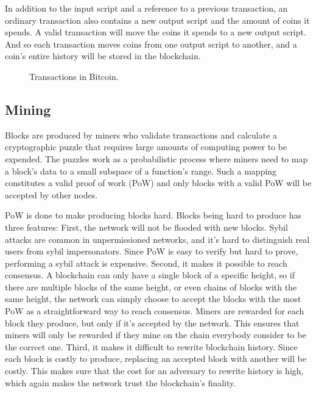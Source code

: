 In addition to the input script and a reference to a previous transaction, an ordinary transaction also contains a new output script and the amount of coins it spends. A valid transaction will move the coins it spends to a new output script. And so each transaction moves coins from one output script to another, and a coin's entire history will be stored in the blockchain. 

\begin{figure}[htbp]
  \centering
  
  \caption{Transactions in Bitcoin.}
  \label{fig:bitcoin-transactions}
\end{figure}

\subsection{Mining}

Blocks are produced by miners who validate transactions and calculate a cryptographic puzzle that requires large amounts of computing power to be expended. The puzzles work as a probabilistic process where miners need to map a block's data to a small subspace of a function's range. Such a mapping constitutes a valid proof of work (PoW) and only blocks with a valid PoW will be accepted by other nodes. 

PoW is done to make producing blocks hard. Blocks being hard to produce has three features: First, the network will not be flooded with new blocks. Sybil attacks are common in unpermissioned networks, and it's hard to distinguish real users from sybil impersonators. Since PoW is easy to verify but hard to prove, performing a sybil attack is expensive. Second, it makes it possible to reach consensus. A blockchain can only have a single block of a specific height, so if there are multiple blocks of the same height, or even chains of blocks with the same height, the network can simply choose to accept the blocks with the most PoW as a straightforward way to reach consensus. Miners are rewarded for each block they produce, but only if it's accepted by the network. This ensures that miners will only be rewarded if they mine on the chain everybody consider to be the correct one. Third, it makes it difficult to rewrite blockchain history. Since each block is costly to produce, replacing an accepted block with another will be costly. This makes sure that the cost for an adversary to rewrite history is high, which again makes the network trust the blockchain's finality.

